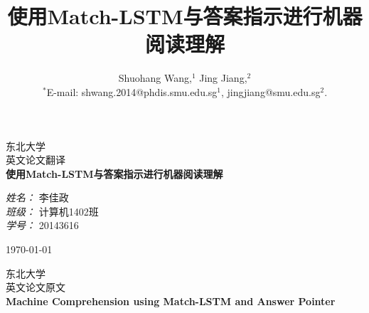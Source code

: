 \documentclass{article}
\title{使用Match-LSTM与答案指示进行机器阅读理解}
\author{
Shuohang Wang,$^{1}$ Jing Jiang,$^{2}$ \\
\normalsize{$^\ast$E-mail: shwang.2014@phdis.smu.edu.sg$^{1}$, jingjiang@smu.edu.sg$^{2}$.}
}
\date{}
\begin{document}
        
    \begin{CJK*}{UTF8}{gbsn}
        \begin{titlepage}

            \begin{center}
            
            
            
            \textsc{\LARGE 东北大学}\\[1.5cm]
            
            \textsc{\Large 英文论文翻译}\\[0.5cm]
            
            {\huge \bfseries 使用Match-LSTM与答案指示进行机器阅读理解}
            
            \vspace{5cm}
            \begin{minipage}{0.4\textwidth}
            \begin{flushleft} 
                \LARGE \emph{姓名：} 李佳政  \\
                \LARGE \emph{班级：} 计算机1402班 \\
                \LARGE \emph{学号：} 20143616 \\
            \end{flushleft}
            \end{minipage}          

            \vfill
            
            {\large \today}
            
            \end{center}
            
        \end{titlepage}
    

        \begin{titlepage}

            \begin{center}
            
            
            
            \textsc{\LARGE 东北大学}\\[1.5cm]
            
            \textsc{\Large 英文论文原文}\\[0.5cm]
            
            {\huge \bfseries Machine Comprehension using Match-LSTM and Answer Pointer}
            

\end{center}
\end{titlepage}
\end{CJK*}
\end{document}
